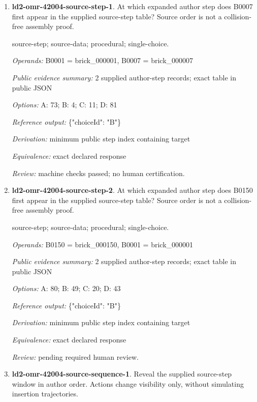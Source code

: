 \begin{enumerate}
\item \textbf{ld2-omr-42004-source-step-1}. At which expanded author step does B0007 first appear in the supplied source-step table? Source order is not a collision-free assembly proof.
\par{\small source-step; source-data; procedural; single-choice.\par\textit{Operands:} B0001 = brick\_000001, B0007 = brick\_000007\par\textit{Public evidence summary:} 2 supplied author-step records; exact table in public JSON\par\textit{Options:} A: 73; B: 4; C: 11; D: 81\par\textit{Reference output:} \{"choiceId": "B"\}\par\textit{Derivation:} minimum public step index containing target\par\textit{Equivalence:} exact declared response\par\textit{Review:} machine checks passed; no human certification.}
\item \textbf{ld2-omr-42004-source-step-2}. At which expanded author step does B0150 first appear in the supplied source-step table? Source order is not a collision-free assembly proof.
\par{\small source-step; source-data; procedural; single-choice.\par\textit{Operands:} B0150 = brick\_000150, B0001 = brick\_000001\par\textit{Public evidence summary:} 2 supplied author-step records; exact table in public JSON\par\textit{Options:} A: 80; B: 49; C: 20; D: 43\par\textit{Reference output:} \{"choiceId": "B"\}\par\textit{Derivation:} minimum public step index containing target\par\textit{Equivalence:} exact declared response\par\textit{Review:} pending required human review.}
\item \textbf{ld2-omr-42004-source-sequence-1}. Reveal the supplied source-step window in author order. Actions change visibility only, without simulating insertion trajectories.

\end{enumerate}
